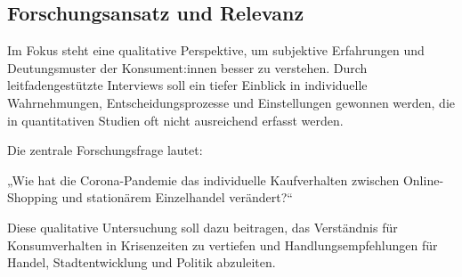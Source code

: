 \subsection{Forschungsansatz und Relevanz}
Im Fokus steht eine qualitative Perspektive, um subjektive Erfahrungen und Deutungsmuster der Konsument:innen besser zu verstehen. Durch leitfadengestützte Interviews soll ein tiefer Einblick in individuelle Wahrnehmungen, Entscheidungsprozesse und Einstellungen gewonnen werden, die in quantitativen Studien oft nicht ausreichend erfasst werden. 

Die zentrale Forschungsfrage lautet: 

„Wie hat die Corona-Pandemie das individuelle Kaufverhalten zwischen Online-Shopping und stationärem Einzelhandel verändert?“ 

Diese qualitative Untersuchung soll dazu beitragen, das Verständnis für Konsumverhalten in Krisenzeiten zu vertiefen und Handlungsempfehlungen für Handel, Stadtentwicklung und Politik abzuleiten. 
